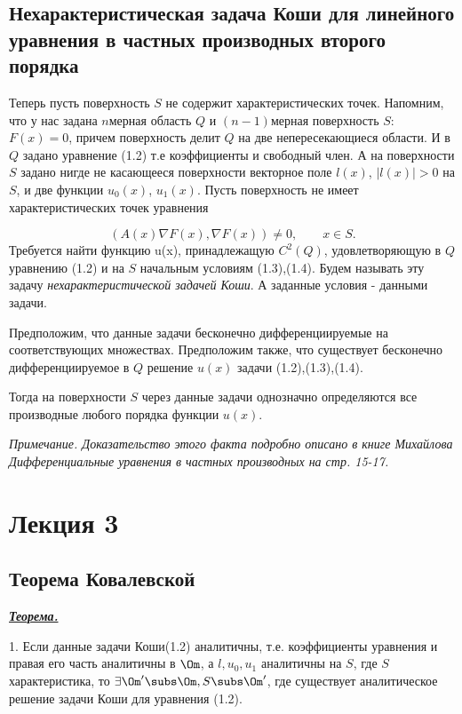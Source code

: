 \documentclass[a4paper,draft]{article}
\begin{document}
\subsection{Нехарактеристическая задача Коши для линейного уравнения в частных производных второго порядка}

Теперь пусть поверхность $S$ не содержит характеристических точек.
Напомним, что у нас задана $n$\д мерная область $Q$  и $(n-1)$\д мерная поверхность $S$: $F(x)=0$, причем поверхность
делит $Q$ на две непересекающиеся области. И в $Q$ задано уравнение (1.2) т.е коэффициенты и свободный член.
А на поверхности $S$ задано нигде не касающееся поверхности векторное поле $l(x)$, $|l(x)|>0$ на $S$,
и две функции $u_0(x)$, $u_1(x)$. Пусть поверхность не имеет характеристических точек уравнения

$$
(A(x)\nabla F(x),\nabla F(x))\neq 0,\qquad x\in S.
$$
Требуется найти функцию u(x), принадлежащую $C^2(Q)$,
удовлетворяющую в $Q$ уравнению (1.2) и на $S$ начальным условиям
(1.3),(1.4). Будем называть эту задачу \textit{нехарактеристической задачей Коши}.
А заданные условия - данными задачи.


Предположим, что данные задачи бесконечно дифференциируемые
на соответствующих множествах. Предположим также, что существует
бесконечно дифференциируемое в $Q$ решение $u(x)$ задачи (1.2),(1.3),(1.4).

Тогда на поверхности $S$ через данные задачи однозначно определяются все
производные любого порядка функции $u(x)$.

\textit{Примечание. Доказательство этого факта подробно описано
в книге Михайлова Дифференциальные уравнения в частных производных на стр. 15-17.}







\section{Лекция 3}

\subsection{Теорема Ковалевской}

\underline{\textit{\textbf{Теорема.}}}

1. Если данные задачи Коши(1.2) аналитичны, т.е. коэффициенты
уравнения и правая его часть аналитичны в $\Om$, а $l, u_0,
u_1$ аналитичны на $S$, где $S$\т характеристика, то $\exists
\Om' \subs \Om, S \subs \Om'$, где существует
аналитическое решение задачи Коши для уравнения (1.2).
\end{document}
